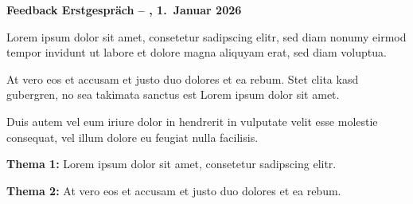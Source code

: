 \documentclass[10pt, a4paper]{article}
\begin{document}
\makeletterhead

\noindent
{\color{headercolor}\sffamily\bfseries\large Feedback Erstgespräch -- \companyname, 1.~Januar 2026}


\noindent
Lorem ipsum dolor sit amet, consetetur sadipscing elitr, sed diam nonumy eirmod tempor invidunt ut labore et dolore magna aliquyam erat, sed diam voluptua.


\noindent
At vero eos et accusam et justo duo dolores et ea rebum. Stet clita kasd gubergren, no sea takimata sanctus est Lorem ipsum dolor sit amet.


\noindent
Duis autem vel eum iriure dolor in hendrerit in vulputate velit esse molestie consequat, vel illum dolore eu feugiat nulla facilisis.


\noindent
\textbf{Thema 1:} Lorem ipsum dolor sit amet, consetetur sadipscing elitr.

\textbf{Thema 2:} At vero eos et accusam et justo duo dolores et ea rebum.
\end{document}
